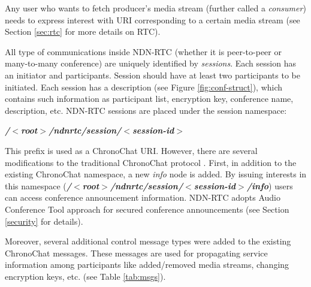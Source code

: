 \documentclass[12pt]{article}
\begin{document}
Any user who wants to fetch producer's media stream (further called a \textit{consumer}) needs to express interest with URI corresponding to a certain media stream (see Section \ref{sec:rtc} for more details on RTC). 

All type of communications inside NDN-RTC (whether it is peer-to-peer or many-to-many conference) are uniquely identified by \textit{sessions}. Each session has an initiator and participants. Session should have at least two participants to be initiated. Each session has a description (see Figure \ref{fig:conf-struct}), which contains such information as participant list, encryption key, conference name, description, etc. NDN-RTC sessions are placed under the session namespace:

\begin{center}
\textbf{\textit{/$<$root$>$/ndnrtc/session/$<$session-id$>$}}
\end{center}

This prefix is used as a ChronoChat URI. However, there are several modifications to the traditional ChronoChat protocol \cite{ChronoTR}. First, in addition to the existing ChronoChat namespace, a new \textit{info} node is added. By issuing interests in this namespace (\textbf{\textit{/$<$root$>$/ndnrtc/session/$<$session-id$>$/info}}) users can access conference announcement information. NDN-RTC adopts Audio Conference Tool approach \cite{act-sec} for secured conference announcements (see Section \ref{security} for details).

Moreover, several additional control message types were added to the existing ChronoChat messages. These messages are used for propagating service information among participants like added/removed media streams, changing encryption keys, etc. (see Table \ref{tab:msgs}). 
\end{document}
